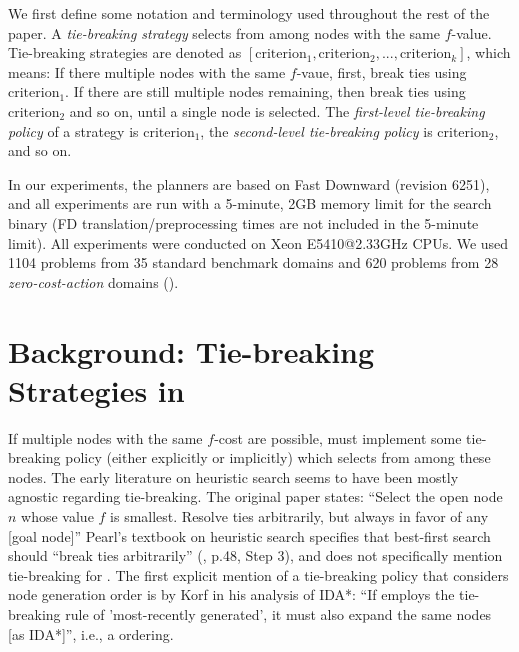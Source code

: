We first define some notation and terminology used throughout the rest of the paper.
A \emph{tie-breaking strategy} selects from among nodes with the same $f$-value.
Tie-breaking strategies are denoted as $[\text{criterion}_1, \text{criterion}_2, ..., \text{criterion}_k]$,
which means: If there multiple nodes with the same $f$-vaue, first, break ties using $\text{criterion}_1$. 
If there are still multiple nodes remaining, then break ties using $\text{criterion}_2$ and so on, until a single node is selected.
The \emph{first-level tie-breaking policy} of a strategy is
$\text{criterion}_1$, the \emph{second-level tie-breaking policy} is
$\text{criterion}_2$, and so on.

In our experiments, the planners are based on Fast Downward (revision 6251), and all
experiments are run with a 5-minute, 2GB memory limit for the search binary (FD translation/preprocessing times are not included in the 5-minute limit).
All experiments were conducted on Xeon E5410@2.33GHz CPUs.
We used 1104 problems from 35 standard benchmark domains
and 620 problems from 28 \emph{zero-cost-action} domains ().


\section{Background: Tie-breaking Strategies in \astar}


If multiple nodes with the same $f$-cost are possible, \astar
must implement some tie-breaking policy (either
explicitly or implicitly) which selects from among these nodes.
The early literature on heuristic search seems to have been mostly agnostic regarding tie-breaking.
The original \astar paper 
states: ``Select the open node $n$ whose value $f$
is smallest. Resolve ties arbitrarily, but always in favor of any [goal
node]'' \cite[p.102 Step 2]{hart1968formal} %
Pearl's textbook on heuristic search specifies that best-first search should ``break ties arbitrarily'' (\citeyear{pearl1984heuristics}, p.48, Step 3), and does not specifically mention tie-breaking for \astar.
The first explicit mention of a tie-breaking policy that considers node generation order is by Korf in his analysis of IDA*: ``If \astar employs the tie-breaking rule of 'most-recently generated', it must also expand the same nodes [as IDA*]'', i.e., a \lifo ordering.

